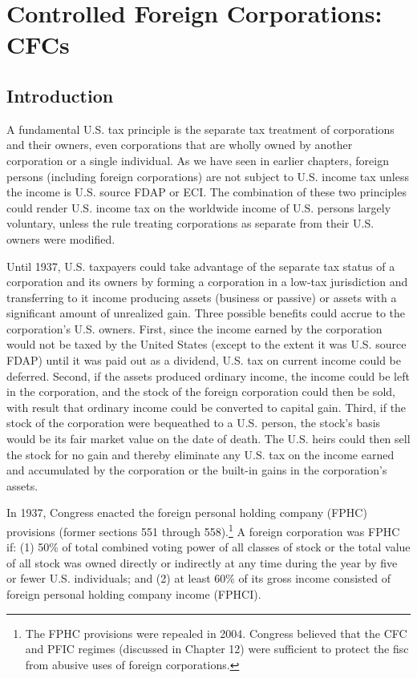 \chapter{Controlled Foreign Corporations:  CFCs}

	\section{Introduction}
	
A fundamental U.S. tax principle is the separate tax treatment of corporations and their owners, even corporations that are wholly owned by another corporation or a single individual.  As we have seen in earlier chapters, foreign persons (including foreign corporations) are not subject to U.S. income tax unless the income is U.S. source FDAP or ECI.  The combination of these two principles could render U.S. income tax on the worldwide income of U.S. persons largely voluntary, unless the rule treating corporations as separate from their U.S. owners were modified.
	
Until 1937, U.S. taxpayers could take advantage of the separate tax status of a corporation and its owners by forming a corporation in a low-tax jurisdiction and transferring to it income producing assets (business or passive) or assets with a significant amount of unrealized gain.  Three possible benefits could accrue to the corporation's U.S. owners.  First, since the income earned by the corporation would not be taxed by the United States (except to the extent it was U.S. source FDAP) until it was paid out as a dividend, U.S. tax on current income could be deferred.  Second, if the assets produced ordinary income, the income could be left in the corporation, and the stock of the foreign corporation could then be sold, with result that ordinary income could be converted to capital gain.  Third, if the stock of the corporation were bequeathed to a U.S. person, the stock's basis would be its fair market value on the date of death.  The U.S. heirs could then sell the stock for no gain and thereby eliminate any U.S. tax on the income earned and accumulated by the corporation or the built-in gains in the corporation's assets.  

In 1937, Congress enacted the foreign personal holding company (FPHC) provisions (former sections 551 through 558).\footnote{The FPHC provisions were repealed in 2004.  Congress believed that the CFC and PFIC regimes (discussed in Chapter 12) were sufficient to protect the fisc from abusive uses of foreign corporations.}  A foreign corporation was FPHC if: (1) 50\% of total combined voting power of all classes of stock or the total value of all stock was owned directly or indirectly at any time during the year by five or fewer U.S. individuals; and (2) at least 60\% of its gross income consisted of foreign personal holding company income (FPHCI).  
	
